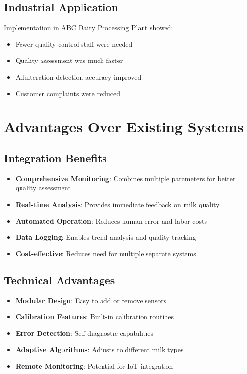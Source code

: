 \documentclass[12pt,a4paper]{article}
\begin{document}
\subsection{Industrial Application}
Implementation in ABC Dairy Processing Plant showed:
\begin{itemize}
    \item Fewer quality control staff were needed
    \item Quality assessment was much faster
    \item Adulteration detection accuracy improved
    \item Customer complaints were reduced
\end{itemize}

\section{Advantages Over Existing Systems}

\subsection{Integration Benefits}
\begin{itemize}
    \item \textbf{Comprehensive Monitoring}: Combines multiple parameters for better quality assessment
    \item \textbf{Real-time Analysis}: Provides immediate feedback on milk quality
    \item \textbf{Automated Operation}: Reduces human error and labor costs
    \item \textbf{Data Logging}: Enables trend analysis and quality tracking
    \item \textbf{Cost-effective}: Reduces need for multiple separate systems
\end{itemize}

\subsection{Technical Advantages}
\begin{itemize}
    \item \textbf{Modular Design}: Easy to add or remove sensors
    \item \textbf{Calibration Features}: Built-in calibration routines
    \item \textbf{Error Detection}: Self-diagnostic capabilities
    \item \textbf{Adaptive Algorithms}: Adjusts to different milk types
    \item \textbf{Remote Monitoring}: Potential for IoT integration
\end{itemize}
\end{document}
